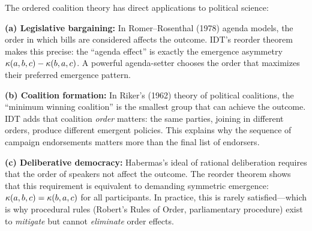 \begin{interpretation}
The ordered coalition theory has direct applications to political science:

\textbf{(a) Legislative bargaining:} In Romer--Rosenthal (1978) agenda
models, the order in which bills are considered affects the outcome.
IDT's reorder theorem makes this precise: the ``agenda effect'' is
exactly the emergence asymmetry $\kappa(a, b, c) - \kappa(b, a, c)$.
A powerful agenda-setter chooses the order that maximizes their
preferred emergence pattern.

\textbf{(b) Coalition formation:} In Riker's (1962) theory of political
coalitions, the ``minimum winning coalition'' is the smallest group that
can achieve the outcome. IDT adds that coalition \emph{order} matters:
the same parties, joining in different orders, produce different emergent
policies. This explains why the sequence of campaign endorsements matters
more than the final list of endorsers.

\textbf{(c) Deliberative democracy:} Habermas's ideal of rational
deliberation requires that the order of speakers not affect the outcome.
The reorder theorem shows that this requirement is equivalent to
demanding symmetric emergence: $\kappa(a, b, c) = \kappa(b, a, c)$
for all participants. In practice, this is rarely satisfied---which is
why procedural rules (Robert's Rules of Order, parliamentary procedure)
exist to \emph{mitigate} but cannot \emph{eliminate} order effects.
\end{interpretation}

